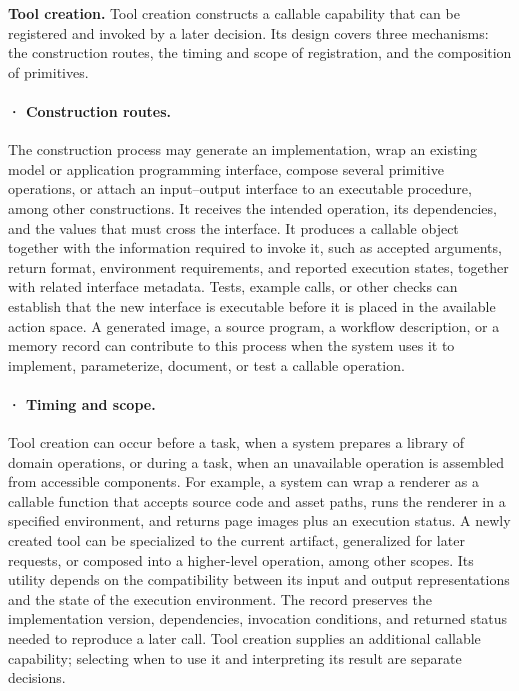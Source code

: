 \textbf{Tool creation.} Tool creation constructs a callable capability that can be registered and invoked by a later decision. Its design covers three mechanisms: the construction routes, the timing and scope of registration, and the composition of primitives.

\paragraph{· Construction routes.} The construction process may generate an implementation, wrap an existing model or application programming interface, compose several primitive operations, or attach an input--output interface to an executable procedure, among other constructions. It receives the intended operation, its dependencies, and the values that must cross the interface. It produces a callable object together with the information required to invoke it, such as accepted arguments, return format, environment requirements, and reported execution states, together with related interface metadata. Tests, example calls, or other checks can establish that the new interface is executable before it is placed in the available action space. A generated image, a source program, a workflow description, or a memory record can contribute to this process when the system uses it to implement, parameterize, document, or test a callable operation.

\paragraph{· Timing and scope.} Tool creation can occur before a task, when a system prepares a library of domain operations, or during a task, when an unavailable operation is assembled from accessible components. For example, a system can wrap a renderer as a callable function that accepts source code and asset paths, runs the renderer in a specified environment, and returns page images plus an execution status. A newly created tool can be specialized to the current artifact, generalized for later requests, or composed into a higher-level operation, among other scopes. Its utility depends on the compatibility between its input and output representations and the state of the execution environment. The record preserves the implementation version, dependencies, invocation conditions, and returned status needed to reproduce a later call. Tool creation supplies an additional callable capability; selecting when to use it and interpreting its result are separate decisions.

